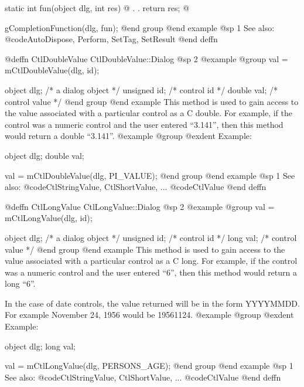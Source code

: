 static  int     fun(object dlg, int res)
@{
        .
        .
        return res;
@}

        gCompletionFunction(dlg, fun);
@end group
@end example
@sp 1
See also:  @code{AutoDispose, Perform, SetTag, SetResult}
@end deffn














@deffn {CtlDoubleValue} CtlDoubleValue::Dialog
@sp 2
@example
@group
val = mCtlDoubleValue(dlg, id);

object  dlg;    /*  a dialog object  */
unsigned id;    /*  control id       */
double  val;    /*  control value    */
@end group
@end example
This method is used to gain access to the value associated with a
particular control as a C double.  For example, if the control
was a numeric control and the user entered ``3.141'', then this method
would return a double ``3.141''.
@example
@group
@exdent Example:

object  dlg;
double  val;

val = mCtlDoubleValue(dlg, PI_VALUE);
@end group
@end example
@sp 1
See also:  @code{CtlStringValue, CtlShortValue, ...}
        @code{CtlValue}
@end deffn

















@deffn {CtlLongValue} CtlLongValue::Dialog
@sp 2
@example
@group
val = mCtlLongValue(dlg, id);

object  dlg;    /*  a dialog object  */
unsigned id;    /*  control id       */
long    val;    /*  control value    */
@end group
@end example
This method is used to gain access to the value associated with a
particular control as a C long.  For example, if the control
was a numeric control and the user entered ``6'', then this method
would return a long ``6''.

In the case of date controls, the value returned will be in the
form YYYYMMDD.  For example November 24, 1956 would be
19561124.
@example
@group
@exdent Example:

object  dlg;
long    val;

val = mCtlLongValue(dlg, PERSONS_AGE);
@end group
@end example
@sp 1
See also:  @code{CtlStringValue, CtlShortValue, ...}
        @code{CtlValue}
@end deffn














